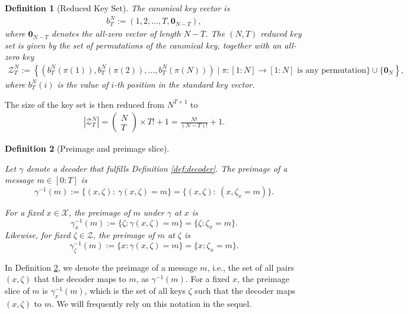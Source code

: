 \documentclass[11pt,letterpaper]{article}
\newtheorem{definition}{\textbf{Definition}}%
\newcommand{\cZ}{\mathcal{Z}}
\begin{document}
\begin{definition}[Reduced Key Set] \label{def:reduced_key_set}
    The canonical key vector is 
    \begin{align}
        b_T^N := (1, 2, \ldots, T, \mathbf{0}_{N-T}),
    \end{align}
    where $\mathbf{0}_{N-T}$ denotes the all-zero vector of length $N-T$. The $(N,T)$ reduced key set is given by the set of permutations of the canonical key, together with an all-zero key
    \begin{align}
        \mathcal{Z}_T^N := \left\{ (b_T^N(\pi(1)), b_T^N(\pi(2)), \ldots, b_T^N(\pi(N))) \mid \pi : [1\!:\!N] \rightarrow [1\!:\!N] \text{ is any permutation} \} \cup \{ \mathbf{0}_N \right\},
    \end{align}
    where $b_T^N(i)$ is the value of $i$-th position in the standard key vector.
\end{definition}

The size of the key set is then reduced from $N^{T+1}$ to 
\begin{align*}
    |\cZ^N_T| = \left( \begin{gathered}N\\ T\end{gathered} \right)   \times T! + 1 =\frac{N!}{\left( N-T\right)  !} + 1.
\end{align*}

\begin{definition}[Preimage and preimage slice]\label{def:preimage}

Let $\gamma$ denote a decoder that fulfills Definition \ref{def:decoder}. The preimage of a message $m\in[0:T]$ is
\[
\gamma^{-1}(m) := \{(x,\zeta):\ \gamma(x,\zeta)=m\} = \{(x,\zeta):\ (x,\zeta_x = m) \}.
\]

For a fixed $x \in \mathcal{X}$, the preimage of $m$ under $\gamma$ at $x$ is
\[
\gamma^{-1}_x(m):= \{\zeta : \gamma(x,\zeta)=m\} = \{\zeta : \zeta_x = m\}. 
\]
Likewise, for fixed $\zeta \in \mathcal{Z}$, the preimage of $m$ at $\zeta$ is
\[
\gamma^{-1}_\zeta(m):= \{x : \gamma(x,\zeta)=m\} = \{x : \zeta_x = m\}.
\]
\end{definition}

In Definition \ref{def:preimage}, we denote the preimage of a message $m$, i.e., the set of all pairs $(x,\zeta)$ that the decoder maps to $m$, as $\gamma^{-1}(m)$. For a fixed $x$, the preimage slice of $m$ is $\gamma_x^{-1}(m)$, which is the set of all keys $\zeta$ such that the decoder maps $(x,\zeta)$ to $m$. We will frequently rely on this notation in the sequel.
\end{document}
